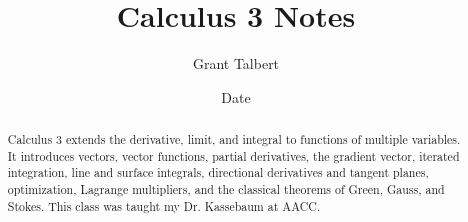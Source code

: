 \documentclass[12pt, letterpaper]{report}
\title{Calculus 3 Notes}
\author{Grant Talbert}
\date{Date}
\begin{document}
	\maketitle
	
	\begin{abstract}
		Calculus 3 extends the derivative, limit, and integral to functions of multiple variables. It introduces vectors, vector functions, partial derivatives, the gradient vector, iterated integration, line and surface integrals, directional derivatives and tangent planes, optimization, Lagrange multipliers, and the classical theorems of Green, Gauss, and Stokes. This class was taught my Dr. Kassebaum at AACC.
	\end{abstract}
	
	\newpage
	
	\tableofcontents
	
	\newpage



%

\end{document}
